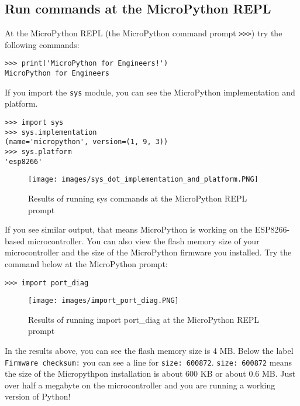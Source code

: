 \documentclass{book}
\makeatletter
\def\maxwidth{\ifdim\Gin@nat@width>\linewidth\linewidth
\else\Gin@nat@width\fi}
\let\Oldincludegraphics\includegraphics
\renewcommand{\includegraphics}[1]{\Oldincludegraphics[width=.8\maxwidth]{#1}}
\newcommand{\passthrough}[1]{#1}
\makeatother
\begin{document}
    
        \hypertarget{run-commands-at-the-micropython-repl}{%
\subsection{Run commands at the MicroPython
REPL}\label{run-commands-at-the-micropython-repl}}
    




    
        At the MicroPython REPL (the MicroPython command prompt
\passthrough{\lstinline!>>>!}) try the following commands:

\begin{lstlisting}
>>> print('MicroPython for Engineers!')
MicroPython for Engineers
\end{lstlisting}

If you import the \passthrough{\lstinline!sys!} module, you can see the
MicroPython implementation and platform.

\begin{lstlisting}
>>> import sys
>>> sys.implementation
(name='micropython', version=(1, 9, 3))
>>> sys.platform
'esp8266'
\end{lstlisting}

\begin{figure}
\centering
\texttt{[image: images/sys\_dot\_implementation\_and\_platform.PNG]}
\caption{Results of running sys commands at the MicroPython REPL prompt}
\end{figure}

If you see similar output, that means MicroPython is working on the
ESP8266-based microcontroller. You can also view the flash memory size
of your microcontroller and the size of the MicroPython firmware you
installed. Try the command below at the MicroPython prompt:

\begin{lstlisting}
>>> import port_diag
\end{lstlisting}

\begin{figure}
\centering
\texttt{[image: images/import\_port\_diag.PNG]}
\caption{Results of running import port\_diag at the MicroPython REPL
prompt}
\end{figure}

In the results above, you can see the flash memory size is 4 MB. Below
the label \passthrough{\lstinline!Firmware checksum:!} you can see a
line for \passthrough{\lstinline!size: 600872!}.
\passthrough{\lstinline!size: 600872!} means the size of the
Micropythpon installation is about 600 KB or about 0.6 MB. Just over
half a megabyte on the microcontroller and you are running a working
version of Python!
\end{document}
